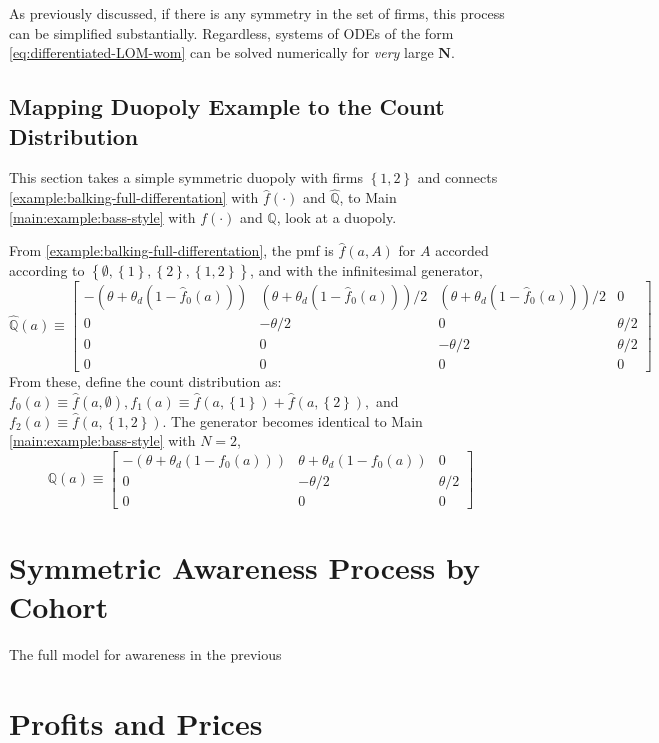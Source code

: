 \documentclass[12pt]{article}
\newcommand{\set}[1]{\ensuremath{\left\{{#1}\right\}}}
\newcommand{\Q}[0]{\ensuremath{\mathbb{Q}}}
\begin{document}
As previously discussed, if there is any symmetry in the set of firms, this process can be simplified substantially.  Regardless, systems of ODEs of the form \cref{eq:differentiated-LOM-wom} can be solved numerically for \textit{very} large $\mathbf{N}$.

\subsection{Mapping Duopoly Example to the Count Distribution}\label{sec:mapping-duopoly}
This section takes a simple symmetric duopoly with firms $\set{1,2}$ and connects \cref{example:balking-full-differentation} with $\hat{f}(\cdot)$  and $\hat{\Q}$, to Main  \cref{main:example:bass-style}  with $f(\cdot)$ and $\Q$, look at a duopoly.

From \cref{example:balking-full-differentation}, the pmf is $\hat{f}(a, A)$ for $A$ accorded according to $\set{\emptyset, \set{1}, \set{2}, \set{1,2}}$, and with the infinitesimal generator,
$$
\hat{\Q}(a) \equiv \begin{bmatrix}
-(\theta + \theta_d(1 - \hat{f}_0(a))) & (\theta + \theta_d(1 - \hat{f}_0(a)))/2 & (\theta + \theta_d(1 - \hat{f}_0(a)))/2 & 0\\
0 & -\theta/2 & 0 & \theta/2\\
0 & 0 & -\theta/2 & \theta/2\\
0 & 0 & 0 & 0
\end{bmatrix}
$$
From these, define the count distribution as: $f_0(a) \equiv \hat{f}(a, \emptyset), f_1(a) \equiv \hat{f}(a, \set{1}) + \hat{f}(a, \set{2}),$ and $ f_2(a) \equiv \hat{f}(a, \set{1,2})$.  The generator becomes identical to  Main  \cref{main:example:bass-style} with $N=2$,
$$
\Q(a) \equiv \begin{bmatrix}
-(\theta + \theta_d(1 - f_0(a))) & \theta + \theta_d(1 - f_0(a))& 0\\
0 & -\theta/2 & \theta/2\\
0 & 0 & 0
\end{bmatrix}
$$

\section{Symmetric Awareness Process by Cohort}\label{sec:cohort-symmetry}
The full model for awareness in the previous 


\section{Profits and Prices}
\end{document}
